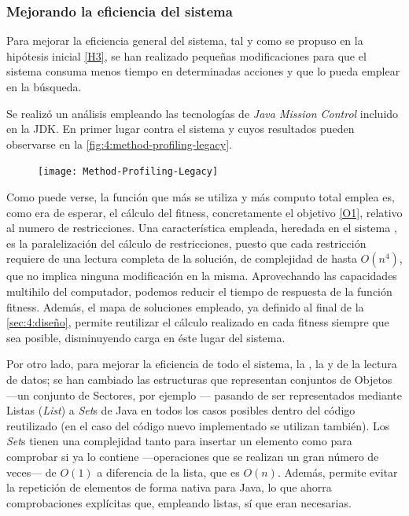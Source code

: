 \subsubsection{Mejorando la eficiencia del sistema}
\label{sec:4:mejorando-eficiencia}

Para mejorar la eficiencia general del sistema, tal y como se propuso en la hipótesis inicial \ref{H3}, se han realizado pequeñas modificaciones para que el sistema consuma menos tiempo en determinadas acciones y que lo pueda emplear en la búsqueda.

Se realizó un análisis empleando las tecnologías de \textit{Java Mission Control} incluido en la JDK. En primer lugar contra el sistema \legacy{} y cuyos resultados pueden observarse en la \autoref{fig:4:method-profiling-legacy}.

\begin{figure}
	\centering
	\texttt{[image: Method-Profiling-Legacy]}
	\caption{}
	\label{fig:4:method-profiling-legacy}
\end{figure}

Como puede verse, la función que más se utiliza y más computo total emplea es, como era de esperar, el cálculo del fitness, concretamente el objetivo \ref{O1}, relativo al numero de restricciones. Una característica empleada, heredada en el sistema \legacy{}, es la paralelización del cálculo de restricciones, puesto que cada restricción requiere de una lectura completa de la solución, de complejidad de hasta $O(n^4)$, que no implica ninguna modificación en la misma. Aprovechando las capacidades multihilo del computador, podemos reducir el tiempo de respuesta de la función fitness. Además, el mapa de soluciones empleado, ya definido al final de la \autoref{sec:4:diseño}, permite reutilizar el cálculo realizado en cada fitness siempre que sea posible, disminuyendo carga en éste lugar del sistema.

Por otro lado, para mejorar la eficiencia de todo el sistema, la \faseuno{}, la \fasedos{} y de la lectura de datos; se han cambiado las estructuras que representan conjuntos de Objetos ---un conjunto de Sectores, por ejemplo --- pasando de ser representados mediante Listas (\textit{List}) a \textit{Set}s de Java en todos los casos posibles dentro del código \legacy{} reutilizado (en el caso del código nuevo implementado se utilizan también). Los \textit{Set}s tienen una complejidad tanto para insertar un elemento como para comprobar si ya lo contiene ---operaciones que se realizan un gran número de veces--- de $O(1)$ a diferencia de la lista, que es $O(n)$. Además, permite evitar la repetición de elementos de forma nativa para Java, lo que ahorra comprobaciones explícitas que, empleando listas, sí que eran necesarias.

